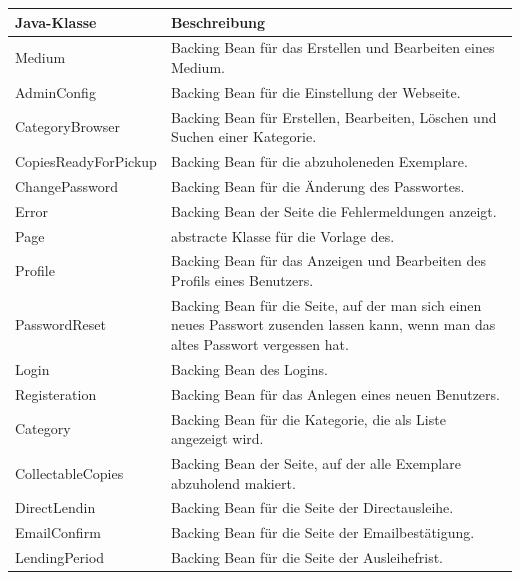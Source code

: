 \documentclass{article}
\begin{document}
 \begin{center}
    \begin{table}
        \begin{tabular} { |p{}|p{}| }
            \hline
            Java-Klasse & Beschreibung  \\
            \hline\hline
            Medium & Backing Bean für das Erstellen und Bearbeiten eines Medium.\\
            \hline
            AdminConfig & Backing Bean für die Einstellung der Webseite.\\
            \hline
            CategoryBrowser & Backing Bean für Erstellen, Bearbeiten, Löschen und Suchen einer Kategorie.\\
            \hline
            CopiesReadyForPickup & Backing Bean für die abzuholeneden Exemplare.\\
            \hline 
            ChangePassword & Backing Bean für die Änderung des Passwortes.\\
            \hline
            Error & Backing Bean der Seite die Fehlermeldungen anzeigt.\\
            \hline
            Page & abstracte Klasse für die Vorlage des.\\
            \hline
            Profile & Backing Bean für das Anzeigen und Bearbeiten des Profils eines Benutzers. \\
            \hline
            PasswordReset & Backing Bean für die Seite, auf der man sich einen neues Passwort zusenden lassen kann, wenn man das altes Passwort vergessen hat.\\
             \hline
            Login & Backing Bean des Logins.\\
             \hline
            Registeration & Backing Bean für das Anlegen eines neuen Benutzers.\\
            \hline
            Category & Backing Bean für die Kategorie, die als Liste angezeigt wird.\\
            \hline
            CollectableCopies & Backing Bean der Seite, auf der alle Exemplare abzuholend makiert. \\
            \hline
            DirectLendin & Backing Bean für die Seite der Directausleihe.\\
             \hline
            EmailConfirm & Backing Bean für die Seite der Emailbestätigung.\\
             \hline
            LendingPeriod & Backing Bean für die Seite der Ausleihefrist.\\

\end{tabular}
\end{table}
\end{center}
\end{document}
